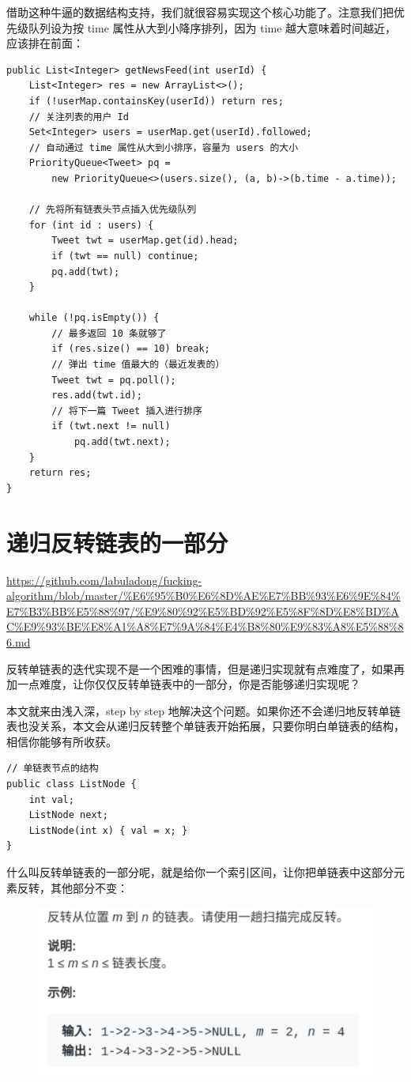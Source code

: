 \documentclass[12pt]{article}
\begin{document}
借助这种牛逼的数据结构支持，我们就很容易实现这个核心功能了。注意我们把优先级队列设为按 time 属性从大到小降序排列，因为 time 越大意味着时间越近，应该排在前面：
\begin{lstlisting}
public List<Integer> getNewsFeed(int userId) {
    List<Integer> res = new ArrayList<>();
    if (!userMap.containsKey(userId)) return res;
    // 关注列表的用户 Id
    Set<Integer> users = userMap.get(userId).followed;
    // 自动通过 time 属性从大到小排序，容量为 users 的大小
    PriorityQueue<Tweet> pq = 
        new PriorityQueue<>(users.size(), (a, b)->(b.time - a.time));

    // 先将所有链表头节点插入优先级队列
    for (int id : users) {
        Tweet twt = userMap.get(id).head;
        if (twt == null) continue;
        pq.add(twt);
    }

    while (!pq.isEmpty()) {
        // 最多返回 10 条就够了
        if (res.size() == 10) break;
        // 弹出 time 值最大的（最近发表的）
        Tweet twt = pq.poll();
        res.add(twt.id);
        // 将下一篇 Tweet 插入进行排序
        if (twt.next != null) 
            pq.add(twt.next);
    }
    return res;
}
\end{lstlisting}

\section{递归反转链表的一部分}
\url{https://github.com/labuladong/fucking-algorithm/blob/master/%E6%95%B0%E6%8D%AE%E7%BB%93%E6%9E%84%E7%B3%BB%E5%88%97/%E9%80%92%E5%BD%92%E5%8F%8D%E8%BD%AC%E9%93%BE%E8%A1%A8%E7%9A%84%E4%B8%80%E9%83%A8%E5%88%86.md}

反转单链表的迭代实现不是一个困难的事情，但是递归实现就有点难度了，如果再加一点难度，让你仅仅反转单链表中的一部分，你是否能够递归实现呢？

本文就来由浅入深，step by step 地解决这个问题。如果你还不会递归地反转单链表也没关系，本文会从递归反转整个单链表开始拓展，只要你明白单链表的结构，相信你能够有所收获。
\begin{lstlisting}
// 单链表节点的结构
public class ListNode {
    int val;
    ListNode next;
    ListNode(int x) { val = x; }
}
\end{lstlisting}

什么叫反转单链表的一部分呢，就是给你一个索引区间，让你把单链表中这部分元素反转，其他部分不变：
\begin{figure}[H]
    \centering
    \includegraphics[width=.5\textwidth]{fig/Reverse_Single_List_1.png}
\end{figure}
\end{document}
